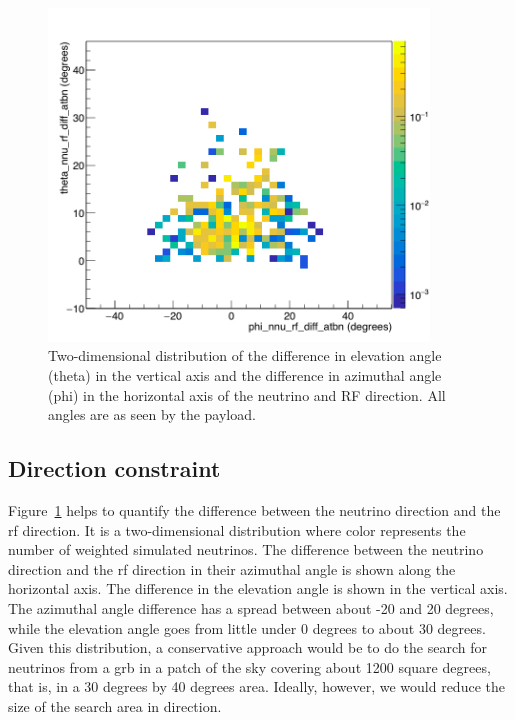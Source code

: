 \begin{figure}
\centering
\includegraphics[width=0.9\textwidth]
{figures/phidiff_vs_thetadiff.png}
\caption{Two-dimensional distribution of the difference in elevation angle (theta) in the vertical axis and the difference in azimuthal angle (phi) in the horizontal axis of the neutrino and RF direction. All angles are as seen by the payload.}
\label{angle_diff}
\end{figure}


\subsection{Direction constraint}

Figure~\ref{angle_diff} helps to quantify the difference between the neutrino direction and the \gls{rf} direction. It is a two-dimensional distribution where color represents the number of weighted simulated neutrinos. The difference between the neutrino direction and the \gls{rf} direction in their azimuthal angle is shown along the horizontal axis. The difference in the elevation angle is shown in the vertical axis. The azimuthal angle difference has a spread between about -20 and 20 degrees, while the elevation angle goes from little under 0 degrees to about 30 degrees. 
Given this distribution, a conservative approach would be to do the search for neutrinos from a \gls{grb} in a patch of the sky covering about 1200 square degrees, that is, in a 30 degrees by 40 degrees area. Ideally, however, we would reduce the size of the search area in direction.  

